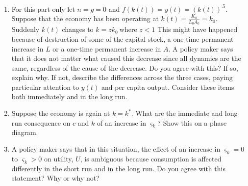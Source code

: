 \documentclass[12pt]{article}
\begin{document}
\begin{enumerate}
\begin{enumerate}
\item For this part only let $n=g=0$ and $f\left( k\left( t\right) \right)
=y\left( t\right) =\left( k\left( t\right) \right) ^{.5}$. Suppose that the
economy has been operating at $k\left( t\right) =\frac{K_{0}}{L_{0}A_{0}}%
=k_{0}.$ Suddenly $k\left( t\right) $ changes to $k=zk_{0}\ $where $z<1$
This might have happened because of destruction of some of the capital
stock, a one-time permanent increase in $L$ or a one-time permanent increase
in $A$. A policy maker says that it does not matter what caused this
decrease since all dynamics are the same, regardless of the cause of the
decrease. Do you agree with this? If so, explain why. If not, describe the
differences across the three cases, paying particular attention to $y\left(
t\right) $ and per capita output. Consider these items both immediately and
in the long run.

\item Suppose the economy is again at $k=k^{\ast }.$ What are the immediate
and long run consequence on $c$ and $k$ of an increase in $\varsigma _{k}?$
Show this on a phase diagram.

\item A policy maker says that in this situation, the effect of an increase
in $\varsigma _{k}=0$ to $\varsigma _{k}>0$ on utility, $U$, is ambiguous
because consumption is affected differently in the short run and in the long
run. Do you agree with this statement? Why or why not?
\end{enumerate}
\end{enumerate}
\end{document}

